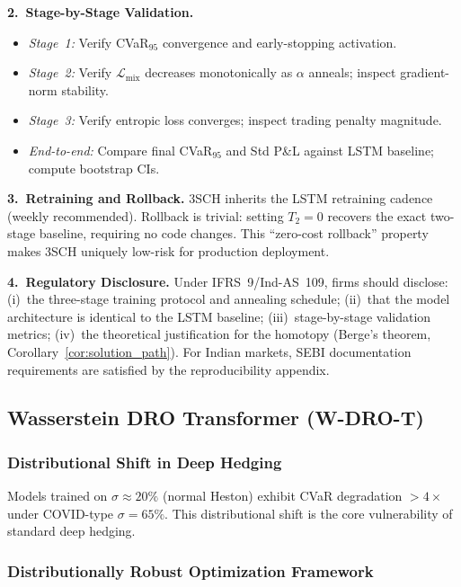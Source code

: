 \textbf{2.\ Stage-by-Stage Validation.}
\begin{itemize}[noitemsep]
    \item \textit{Stage~1:} Verify CVaR$_{95}$ convergence and early-stopping activation.
    \item \textit{Stage~2:} Verify $\mathcal{L}_{\mathrm{mix}}$ decreases monotonically as $\alpha$ anneals; inspect gradient-norm stability.
    \item \textit{Stage~3:} Verify entropic loss converges; inspect trading penalty magnitude.
    \item \textit{End-to-end:} Compare final CVaR$_{95}$ and Std P\&L against LSTM baseline; compute bootstrap CIs.
\end{itemize}

\textbf{3.\ Retraining and Rollback.}
3SCH inherits the LSTM retraining cadence (weekly recommended).  Rollback is trivial: setting $T_2=0$ recovers the exact two-stage baseline, requiring no code changes.  This ``zero-cost rollback'' property makes 3SCH uniquely low-risk for production deployment.

\textbf{4.\ Regulatory Disclosure.}
Under IFRS~9/Ind-AS~109, firms should disclose: (i)~the three-stage training protocol and annealing schedule; (ii)~that the model architecture is identical to the LSTM baseline; (iii)~stage-by-stage validation metrics; (iv)~the theoretical justification for the homotopy (Berge's theorem, Corollary~\ref{cor:solution_path}).  For Indian markets, SEBI documentation requirements are satisfied by the reproducibility appendix.

\subsection{Wasserstein DRO Transformer (W-DRO-T)}
\label{sec:wdrot}

\subsubsection{Distributional Shift in Deep Hedging}

Models trained on $\sigma \approx 20\%$ (normal Heston) exhibit CVaR degradation $>4\times$ under COVID-type $\sigma = 65\%$. This distributional shift is the core vulnerability of standard deep hedging.

\subsubsection{Distributionally Robust Optimization Framework}

